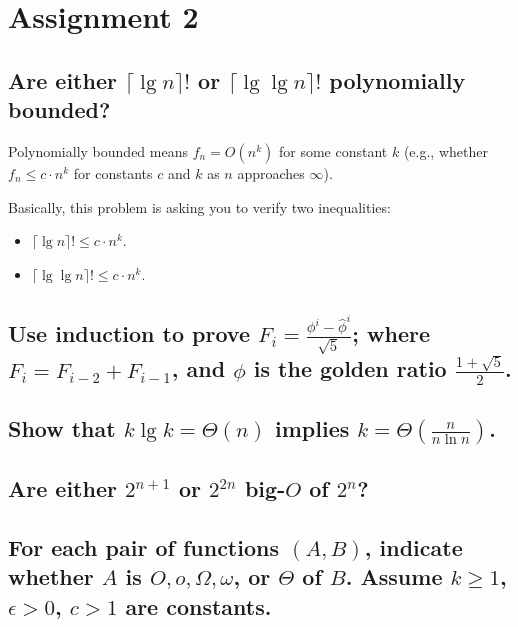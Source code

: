 \chapter{Assignment 2}


\section[Problem 1]{Are either $\lceil \lg n \rceil!$ or $\lceil \lg \lg n \rceil!$ polynomially bounded?}
Polynomially bounded means $f_n = O(n^k)$ for some constant $k$ (e.g., whether $f_n \leq c \cdot n^k$ for constants $c$ and $k$ as $n$ approaches $\infty$). 

Basically, this problem is asking you to verify two inequalities:
\begin{itemize}
	\item $\lceil \lg n \rceil ! \leq c \cdot n^k$.
	\item $\lceil \lg \lg n \rceil ! \leq c \cdot n^k$.
\end{itemize}

\section[Problem 2]{Use induction to prove $F_i = \frac{\phi^i - \hat{\phi}^i}{\sqrt{5}}$; where $F_i = F_{i-2} + F_{i-1}$, and $\phi$ is the golden ratio $\frac{1 + \sqrt{5}}{2}$.}

\section[Problem 3]{Show that $k \lg k = \Theta(n)$ implies $k = \Theta\left(\frac{n}{n \ln n}\right)$.}

\section[Problem 4]{Are either $2^{n + 1}$ or $2^{2n}$ big-$O$ of $2^n$?}

\section[Problem 5]{For each pair of functions $(A, B)$, indicate whether $A$ is $O, o, \Omega, \omega$, or $\Theta$ of $B$. Assume $k \geq 1$, $\epsilon > 0$, $c > 1$ are constants.}


